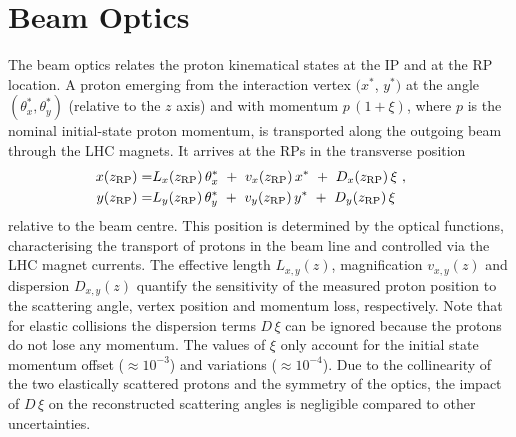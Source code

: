 \section{Beam Optics}
\label{sec:beam optics}

The beam optics relates the proton kinematical states at the IP and at the RP location. A proton emerging from the interaction vertex $(x^*$, $y^*)$ at the angle $(\theta_x^*,\theta_y^*)$ (relative to the $z$ axis) and with momentum $p\,(1+\xi)$, where $p$ is the nominal initial-state proton momentum, is transported along the outgoing beam through the LHC magnets. It arrives at the RPs in the transverse position
\begin{equation}
\label{eq:prot trans}
	\begin{aligned}
		x(z_{\rm RP}) =& L_x(z_{\rm RP})\, \theta_x^*\ +\ v_x(z_{\rm RP})\, x^*\ +\ D_x(z_{\rm RP})\, \xi\ ,\cr
		y(z_{\rm RP}) =& L_y(z_{\rm RP})\, \theta_y^*\ +\ v_y(z_{\rm RP})\, y^*\ +\ D_y(z_{\rm RP})\, \xi \quad
	\end{aligned}
\end{equation}
relative to the beam centre. This position is determined by the optical functions, characterising the transport of protons in the beam line and controlled via the LHC magnet currents.
The effective length $L_{x,y}(z)$, magnification $v_{x,y}(z)$ and dispersion $D_{x,y}(z)$ quantify the sensitivity of the measured proton position to the scattering angle, vertex position and momentum loss, respectively. Note that for elastic collisions the dispersion terms $D\,\xi$ can be ignored because the protons do not lose any momentum. The values of $\xi$ only account for the initial state momentum offset ($\approx 10^{-3}$) and variations ($\approx 10^{-4}$). Due to the collinearity of the two elastically scattered protons and the symmetry of the optics, the impact of $D\,\xi$ on the reconstructed scattering angles is negligible compared to other uncertainties.


